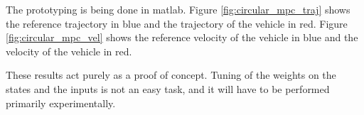The prototyping is being done in matlab. Figure \ref{fig:circular_mpc_traj}
shows the reference trajectory in blue and the trajectory of the vehicle in
red. Figure \ref{fig:circular_mpc_vel} shows the reference velocity of the
vehicle in blue and the velocity of the vehicle in red.

These results act purely as a proof of concept. Tuning of the weights on the
states and the inputs is not an easy task, and it will have to be performed
primarily experimentally.

\noindent{}
